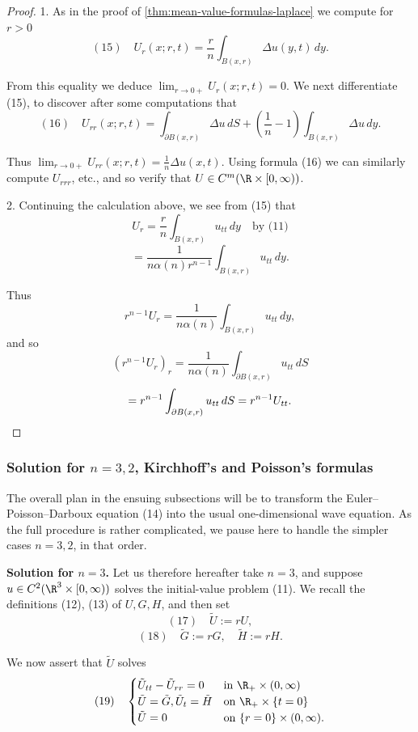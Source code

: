 \begin{proof}
1. As in the proof of \cref{thm:mean-value-formulas-laplace} we compute for $r > 0$
$$(15) \quad U_r(x;r,t) = \frac{r}{n} \int_{B(x,r)} \Delta u(y,t) \, dy.$$

From this equality we deduce $\lim_{r \to 0+} U_r(x;r,t) = 0$. We next differentiate (15), to discover after some computations that
$$(16) \quad U_{rr}(x;r,t) = \int_{\partial B(x,r)} \Delta u \, dS + \left(\frac{1}{n} - 1\right) \int_{B(x,r)} \Delta u \, dy.$$

Thus $\lim_{r \to 0+} U_{rr}(x;r,t) = \frac{1}{n} \Delta u(x,t)$. Using formula (16) we can similarly compute $U_{rrr}$, etc., and so verify that $U \in C^m(\R \times [0, \infty))$.

2. Continuing the calculation above, we see from (15) that
$$U_r = \frac{r}{n} \int_{B(x,r)} u_{tt} \, dy \quad \text{by (11)}$$
$$= \frac{1}{n\alpha(n) r^{n-1}} \int_{B(x,r)} u_{tt} \, dy.$$

Thus
$$r^{n-1} U_r = \frac{1}{n\alpha(n)} \int_{B(x,r)} u_{tt} \, dy,$$
and so
$$(r^{n-1} U_r)_r = \frac{1}{n\alpha(n)} \int_{\partial B(x,r)} u_{tt} \, dS$$
$$= r^{n-1} \int_{\partial B(x,r)} u_{tt} \, dS = r^{n-1} U_{tt}. \qedhere$$
\end{proof}

\subsubsection{Solution for $n = 3, 2$, Kirchhoff's and Poisson's formulas}
\label{sec:wave-kirchhoff-poisson-formulas}

The overall plan in the ensuing subsections will be to transform the Euler--Poisson--Darboux equation (14) into the usual one-dimensional wave equation. As the full procedure is rather complicated, we pause here to handle the simpler cases $n = 3, 2$, in that order.

\textbf{Solution for $n = 3$.} Let us therefore hereafter take $n = 3$, and suppose $u \in C^2(\R^3 \times [0, \infty))$ solves the initial-value problem (11). We recall the definitions (12), (13) of $U, G, H$, and then set
$$(17) \quad \tilde{U} := rU,$$
$$(18) \quad \tilde{G} := rG, \quad \tilde{H} := rH.$$

We now assert that $\tilde{U}$ solves
$$(19) \quad \begin{cases}
\tilde{U}_{tt} - \tilde{U}_{rr} = 0 & \text{in } \R_+ \times (0,\infty) \\
\tilde{U} = \tilde{G}, \tilde{U}_t = \tilde{H} & \text{on } \R_+ \times \{t = 0\} \\
\tilde{U} = 0 & \text{on } \{r = 0\} \times (0,\infty).
\end{cases}$$

